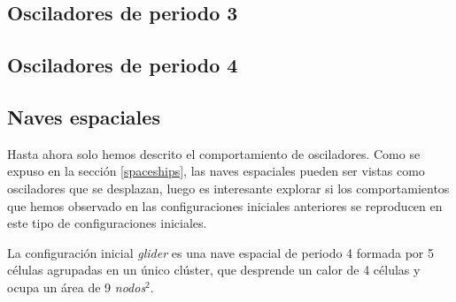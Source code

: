 \documentclass[../proyecto.tex]{memoir}
\begin{document}
\subsection{Osciladores de periodo 3}

\subsection{Osciladores de periodo 4}

\subsection{Naves espaciales}
Hasta ahora solo hemos descrito el comportamiento de osciladores. Como se expuso en la sección \ref{spaceships}, las naves espaciales pueden ser vistas como osciladores que se desplazan, luego es interesante explorar si los comportamientos que hemos observado en las configuraciones iniciales anteriores se reproducen en este tipo de configuraciones iniciales. 

La configuración inicial \textit{glider} es una nave espacial de periodo 4 formada por 5 células agrupadas en un único clúster, que desprende un calor de 4 células y ocupa un área de 9 \textit{nodos}$^2$.



\end{document}
